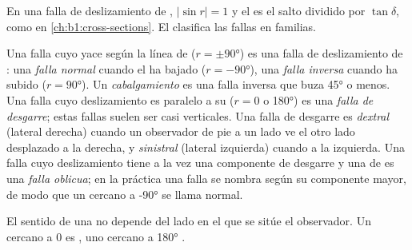En una falla de deslizamiento de , $|\sin r| = 1$ y el  es el salto dividido por
$\tan\delta$, como en \cref{ch:b1:cross-sections}. El  clasifica las fallas en familias.

\begin{definition}\label{def:b1:faults-folds-fabrics:fault-types}
Una falla cuyo  yace según la línea de  ($r = \pm\ang{90}$) es una falla de deslizamiento de
: una \emph{falla normal} cuando el  ha bajado ($r = \ang{-90}$), una
\emph{falla inversa} cuando ha subido ($r = \ang{90}$). Un \emph{cabalgamiento} es una
falla inversa que buza \ang{45} o menos. Una falla cuyo deslizamiento es paralelo a su  ($r = 0$ o \ang{180}) es una
\emph{falla de desgarre}; estas fallas suelen ser casi verticales. Una falla de desgarre es
\emph{dextral} (lateral derecha) cuando un observador de pie a un lado ve el otro lado desplazado a la derecha,
y \emph{sinistral} (lateral izquierda) cuando a la izquierda. Una falla cuyo deslizamiento tiene a la vez una
componente de desgarre y una de  es una \emph{falla oblicua}; en la práctica una falla se nombra
según su componente mayor, de modo que un  cercano a \ang{-90} se llama normal.
\end{definition}

\begin{proposition}\label{prop:b1:faults-folds-fabrics:sense}
El sentido de una  no depende del lado en el que se sitúe el observador. Un  cercano a $0$ es
, uno cercano a \ang{180} .
\end{proposition}

